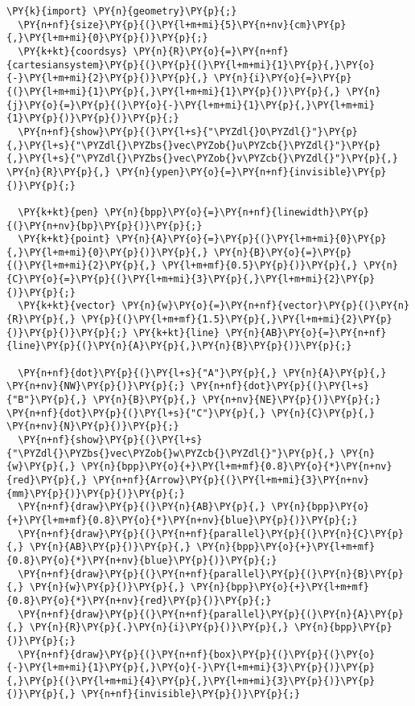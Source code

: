 \begin{Verbatim}[commandchars=\\\{\}]
  \PY{k}{import} \PY{n}{geometry}\PY{p}{;}
  \PY{n+nf}{size}\PY{p}{(}\PY{l+m+mi}{5}\PY{n+nv}{cm}\PY{p}{,}\PY{l+m+mi}{0}\PY{p}{)}\PY{p}{;}
  \PY{k+kt}{coordsys} \PY{n}{R}\PY{o}{=}\PY{n+nf}{cartesiansystem}\PY{p}{(}\PY{p}{(}\PY{l+m+mi}{1}\PY{p}{,}\PY{o}{-}\PY{l+m+mi}{2}\PY{p}{)}\PY{p}{,} \PY{n}{i}\PY{o}{=}\PY{p}{(}\PY{l+m+mi}{1}\PY{p}{,}\PY{l+m+mi}{1}\PY{p}{)}\PY{p}{,} \PY{n}{j}\PY{o}{=}\PY{p}{(}\PY{o}{-}\PY{l+m+mi}{1}\PY{p}{,}\PY{l+m+mi}{1}\PY{p}{)}\PY{p}{)}\PY{p}{;}
  \PY{n+nf}{show}\PY{p}{(}\PY{l+s}{"\PYZdl{}O\PYZdl{}"}\PY{p}{,}\PY{l+s}{"\PYZdl{}\PYZbs{}vec\PYZob{}u\PYZcb{}\PYZdl{}"}\PY{p}{,}\PY{l+s}{"\PYZdl{}\PYZbs{}vec\PYZob{}v\PYZcb{}\PYZdl{}"}\PY{p}{,} \PY{n}{R}\PY{p}{,} \PY{n}{ypen}\PY{o}{=}\PY{n+nf}{invisible}\PY{p}{)}\PY{p}{;}

  \PY{k+kt}{pen} \PY{n}{bpp}\PY{o}{=}\PY{n+nf}{linewidth}\PY{p}{(}\PY{n+nv}{bp}\PY{p}{)}\PY{p}{;}
  \PY{k+kt}{point} \PY{n}{A}\PY{o}{=}\PY{p}{(}\PY{l+m+mi}{0}\PY{p}{,}\PY{l+m+mi}{0}\PY{p}{)}\PY{p}{,} \PY{n}{B}\PY{o}{=}\PY{p}{(}\PY{l+m+mi}{2}\PY{p}{,} \PY{l+m+mf}{0.5}\PY{p}{)}\PY{p}{,} \PY{n}{C}\PY{o}{=}\PY{p}{(}\PY{l+m+mi}{3}\PY{p}{,}\PY{l+m+mi}{2}\PY{p}{)}\PY{p}{;}
  \PY{k+kt}{vector} \PY{n}{w}\PY{o}{=}\PY{n+nf}{vector}\PY{p}{(}\PY{n}{R}\PY{p}{,} \PY{p}{(}\PY{l+m+mf}{1.5}\PY{p}{,}\PY{l+m+mi}{2}\PY{p}{)}\PY{p}{)}\PY{p}{;} \PY{k+kt}{line} \PY{n}{AB}\PY{o}{=}\PY{n+nf}{line}\PY{p}{(}\PY{n}{A}\PY{p}{,}\PY{n}{B}\PY{p}{)}\PY{p}{;}

  \PY{n+nf}{dot}\PY{p}{(}\PY{l+s}{"A"}\PY{p}{,} \PY{n}{A}\PY{p}{,} \PY{n+nv}{NW}\PY{p}{)}\PY{p}{;} \PY{n+nf}{dot}\PY{p}{(}\PY{l+s}{"B"}\PY{p}{,} \PY{n}{B}\PY{p}{,} \PY{n+nv}{NE}\PY{p}{)}\PY{p}{;} \PY{n+nf}{dot}\PY{p}{(}\PY{l+s}{"C"}\PY{p}{,} \PY{n}{C}\PY{p}{,} \PY{n+nv}{N}\PY{p}{)}\PY{p}{;}
  \PY{n+nf}{show}\PY{p}{(}\PY{l+s}{"\PYZdl{}\PYZbs{}vec\PYZob{}w\PYZcb{}\PYZdl{}"}\PY{p}{,} \PY{n}{w}\PY{p}{,} \PY{n}{bpp}\PY{o}{+}\PY{l+m+mf}{0.8}\PY{o}{*}\PY{n+nv}{red}\PY{p}{,} \PY{n+nf}{Arrow}\PY{p}{(}\PY{l+m+mi}{3}\PY{n+nv}{mm}\PY{p}{)}\PY{p}{)}\PY{p}{;}
  \PY{n+nf}{draw}\PY{p}{(}\PY{n}{AB}\PY{p}{,} \PY{n}{bpp}\PY{o}{+}\PY{l+m+mf}{0.8}\PY{o}{*}\PY{n+nv}{blue}\PY{p}{)}\PY{p}{;}
  \PY{n+nf}{draw}\PY{p}{(}\PY{n+nf}{parallel}\PY{p}{(}\PY{n}{C}\PY{p}{,} \PY{n}{AB}\PY{p}{)}\PY{p}{,} \PY{n}{bpp}\PY{o}{+}\PY{l+m+mf}{0.8}\PY{o}{*}\PY{n+nv}{blue}\PY{p}{)}\PY{p}{;}
  \PY{n+nf}{draw}\PY{p}{(}\PY{n+nf}{parallel}\PY{p}{(}\PY{n}{B}\PY{p}{,} \PY{n}{w}\PY{p}{)}\PY{p}{,} \PY{n}{bpp}\PY{o}{+}\PY{l+m+mf}{0.8}\PY{o}{*}\PY{n+nv}{red}\PY{p}{)}\PY{p}{;}
  \PY{n+nf}{draw}\PY{p}{(}\PY{n+nf}{parallel}\PY{p}{(}\PY{n}{A}\PY{p}{,} \PY{n}{R}\PY{p}{.}\PY{n}{i}\PY{p}{)}\PY{p}{,} \PY{n}{bpp}\PY{p}{)}\PY{p}{;}
  \PY{n+nf}{draw}\PY{p}{(}\PY{n+nf}{box}\PY{p}{(}\PY{p}{(}\PY{o}{-}\PY{l+m+mi}{1}\PY{p}{,}\PY{o}{-}\PY{l+m+mi}{3}\PY{p}{)}\PY{p}{,}\PY{p}{(}\PY{l+m+mi}{4}\PY{p}{,}\PY{l+m+mi}{3}\PY{p}{)}\PY{p}{)}\PY{p}{,} \PY{n+nf}{invisible}\PY{p}{)}\PY{p}{;}
\end{Verbatim}
